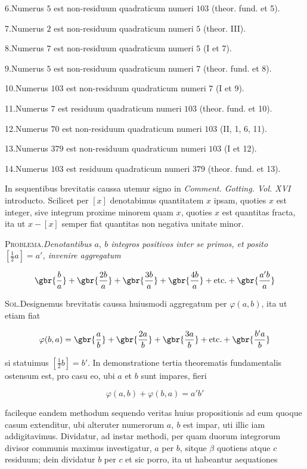 %
6.\quad Numerus $5$ est non-residuum quadraticum numeri $103$ (theor. fund. et 5).

7.\quad Numerus $2$ est non-residuum quadraticum numeri $5$ (theor. III).

8.\quad Numerus $7$ est non-residuum quadraticum numeri $5$ (I et 7).

9.\quad Numerus $5$ est non-residuum quadraticum numeri $7$ (theor. fund. et 8).

10.\quad Numerus $103$ est non-residuum quadraticum numeri $7$ (I et 9).

11.\quad Numerus $7$ est residuum quadraticum numeri $103$ (theor. fund. et 10).

12.\quad Numerus $70$ est non-residuum quadraticum numeri $103$ (II, 1, 6, 11).

13.\quad Numerus $379$ est non-residuum quadraticum numeri $103$ (I et 12).

14.\quad Numerus $103$ est residuum quadraticum numeri $379$ (theor. fund. et 13).

In sequentibus brevitatis caussa utemur signo in \textit{Comment. Gotting. Vol. XVI} introducto. Scilicet per $[x]$ denotabimus quantitatem $x$ ipsam, quoties $x$ est integer, sive integrum proxime minorem quam $x$, quoties $x$ est quantitas fracta, ita ut $x-[x]$ semper fiat quantitas non negativa unitate minor.


\textsc{Problema.}\quad \textit{Denotantibus $a,\ b$ integros positivos inter se primos, et posito $[\frac12a]=a'$, invenire aggregatum}

\[
\gbr{\frac ba}+\gbr{\frac{2b}a}+\gbr{\frac{3b}a}+\gbr{\frac{4b}a}+\text{etc.}+\gbr{\frac{a'b}a}
\]

\textsc{Sol.}\quad Designemus brevitatis caussa huiusmodi aggregatum per $\varphi(a,b)$, ita ut etiam fiat

\[
\varphi(b,a)=\gbr{\frac ab}+\gbr{\frac{2a}b}+\gbr{\frac{3a}b}+\text{etc.}+\gbr{\frac{b'a}b}
\]

si statuimus $[\frac12b]=b'$. In demonstratione tertia theorematis fundamentalis ostensum est, pro casu eo, ubi $a$ et $b$ sunt impares, fieri

\[
\varphi(a,b)+\varphi(b,a)=a'b'
\]

facileque eandem methodum sequendo veritas huius propositionis ad eum quoque casum extenditur, ubi alteruter numerorum $a,\ b$ est impar, uti illic iam addigitavimus. Dividatur, ad instar methodi, per quam duorum integrorum divisor communis maximus investigatur, $a$ per $b$, sitque $\beta$ quotiens atque $c$ residuum; dein dividatur $b$ per $c$ et sic porro, ita ut habeantur aequationes

